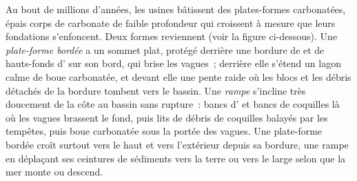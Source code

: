 Au bout de millions d'années, les usines bâtissent des plates-formes carbonatées, épais corps
de carbonate de faible profondeur qui croissent à mesure que leurs fondations s'enfoncent. Deux formes reviennent
(voir la figure ci-dessous). Une \emph{plate-forme bordée} a un
sommet plat, protégé derrière une bordure de  et de hauts-fonds d' sur son bord, qui
brise les vagues~; derrière elle s'étend un lagon calme de boue carbonatée, et devant elle une
pente raide où les blocs et les débris détachés de la bordure tombent vers le bassin. Une
\emph{rampe} s'incline très doucement de la côte au bassin sans rupture~: bancs d' et bancs de coquilles là où les vagues brassent le fond,
puis lits de débris de coquilles balayés par les tempêtes, puis boue carbonatée sous la portée
des vagues. Une plate-forme bordée croît surtout vers le haut et vers l'extérieur depuis sa bordure, une rampe
en déplaçant ses ceintures de sédiments vers la terre ou vers le large selon que la mer monte ou descend.

